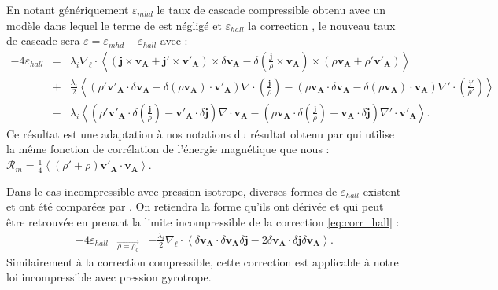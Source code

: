  En notant génériquement $\varepsilon_{mhd}$ le taux de cascade compressible obtenu avec un modèle dans lequel le terme de  est négligé et $\varepsilon_{hall}$ la correction , le nouveau taux de cascade sera $\varepsilon = \varepsilon_{mhd} + \varepsilon_{hall}$ avec  :
\begin{equation}
\label{eq:corr_hall} \boxed{
\begin{array}{lcl}
    -4\varepsilon_{hall} &=& \lambda_i\nabla_{\boldsymbol{\ell}} \cdot \left< \left(\boldsymbol{j}  \times \boldsymbol{v_A}+ \boldsymbol{j'}  \times \boldsymbol{v'_A}\right)\times \delta \boldsymbol{v_A} - \delta \left(\frac{\boldsymbol{j}}{\rho}  \times \boldsymbol{v_A}\right)\times \left(\rho \boldsymbol{v_A}+ \rho' \boldsymbol{v'_A}\right)\right> \\
    &+& \frac{\lambda_i}{2} \left< \left(\rho' \boldsymbol{v'_A} \cdot \delta \boldsymbol{v_A}- \delta \left(\rho \boldsymbol{v_A}\right) \cdot \boldsymbol{v'_A} \right)\nabla \cdot \left(\frac{\boldsymbol{j}}{\rho}\right) - \left(\rho \boldsymbol{v_A} \cdot \delta \boldsymbol{v_A}- \delta \left(\rho \boldsymbol{v_A}\right) \cdot \boldsymbol{v_A} \right) \nabla' \cdot \left(\frac{\boldsymbol{j'}}{\rho'}\right)\right> \\%
    &-& \lambda_i \left< \left(\rho' \boldsymbol{v'_A} \cdot \delta \left(\frac{\boldsymbol{j}}{\rho}\right)- \boldsymbol{v'_A} \cdot \delta \boldsymbol{j}  \right)\nabla \cdot \boldsymbol{v_A} - \left(\rho \boldsymbol{v_A} \cdot \delta \left(\frac{\boldsymbol{j}}{\rho}\right)- \boldsymbol{v_A} \cdot \delta \boldsymbol{j}  \right)\nabla' \cdot \boldsymbol{v'_A}\right> .
   \end{array}}
\end{equation} 
Ce résultat est une adaptation à nos notations du résultat obtenu par \cite{andres_exact_2018} qui utilise la même fonction de corrélation de l'énergie magnétique que nous : $\mathcal{R}_{m} = \frac{1}{4}\left<\left(\rho'+\rho\right)\boldsymbol{v'_A} \cdot \boldsymbol{v_A}\right>$.

Dans le cas incompressible avec pression isotrope, diverses formes de $\varepsilon_{hall}$ existent et ont été comparées par \cite{ferrand_exact_2019}. 
 On retiendra la forme qu'ils ont dérivée et qui peut être retrouvée en prenant la limite incompressible de la correction \eqref{eq:corr_hall} :
 \begin{equation}
 \label{eq:corr_hallinc} \boxed{
\begin{array}{lcl}
    -4 \varepsilon_{hall} &{}_{\overrightarrow{\rho = \rho_0}}&  -\frac{\lambda_i}{2} \nabla_{\boldsymbol{\ell}} \cdot \left<\delta \boldsymbol{v_A} \cdot \delta \boldsymbol{v_A}\delta \boldsymbol{j} - 2 \delta \boldsymbol{v_A} \cdot \delta \boldsymbol{j} \delta \boldsymbol{v_A}\right> . %
   \end{array}}
\end{equation} 
Similairement à la correction compressible, cette correction est applicable à notre loi incompressible avec pression gyrotrope. 

